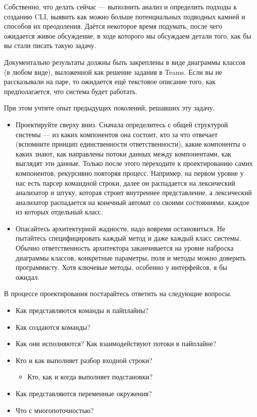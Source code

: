 \documentclass[a5paper]{article}
\begin{document}
Собственно, что делать сейчас --- выполнить анализ и определить подходы к созданию CLI, выявить как можно больше потенциальных подводных камней и способов их преодоления. Даётся некоторое время подумать, после чего ожидается живое обсуждение, в ходе которого мы обсуждаем детали того, как бы вы стали писать такую задачу.

Документально результаты должны быть закреплены в виде диаграммы классов (в любом виде), выложенной как решение задания в Teams. Если вы не рассказывали на паре, то ожидается ещё текстовое описание того, как предполагается, что система будет работать.

При этом учтите опыт предыдущих поколений, решавших эту задачу.
\begin{itemize}
    \item Проектируйте сверху вниз. Сначала определитесь с общей структурой системы --- из каких компонентов она состоит, кто за что отвечает (вспомните принцип единственности ответственности), какие компоненты о каких знают, как направлены потоки данных между компонентами, как выглядят эти данные. Только после этого переходите к проектированию самих компонентов, рекурсивно повторяя процесс. Например, на первом уровне у нас есть парсер командной строки, далее он распадается на лексический анализатор и штуку, которая строит внутреннее представление, а лексический анализатор распадается на конечный автомат со своими состояниями, каждое из которых отдельный класс.
    \item Опасайтесь архитектурной жадности, надо вовремя остановиться. Не пытайтесь специфицировать каждый метод и даже каждый класс системы. Обычно ответственность архитектора заканчивается на уровне наброска диаграммы классов, конкретные параметры, поля и методы можно доверить программисту. Хотя ключевые методы. особенно у интерфейсов, я бы ожидал.
\end{itemize}

В процессе проектирования постарайтесь ответить на следующие вопросы.

\begin{itemize}
    \item Как представляются команды и пайплайны?
    \item Как создаются команды?
    \item Как они исполняются? Как взаимодействуют потоки в пайплайне?
    \item Кто и как выполняет разбор входной строки?
    \begin{itemize}
        \item Кто, как и когда выполняет подстановки?
    \end{itemize}
    \item Как представляются переменные окружения?
    \item Что с многопоточностью?
\end{itemize}
\end{document}
